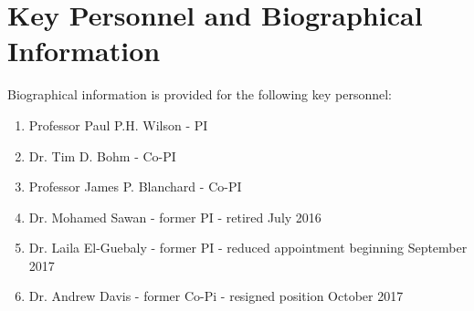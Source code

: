 \chapter{Key Personnel and Biographical Information}

Biographical information is provided for the following key personnel:
\begin{enumerate}
\item Professor Paul P.H. Wilson - PI
\item Dr. Tim D. Bohm - Co-PI
\item Professor James P. Blanchard - Co-PI
\item Dr. Mohamed Sawan - former PI - retired July 2016
\item Dr. Laila El-Guebaly - former PI - reduced appointment beginning September 2017
\item Dr. Andrew Davis - former Co-Pi - resigned position October 2017
\end{enumerate}








